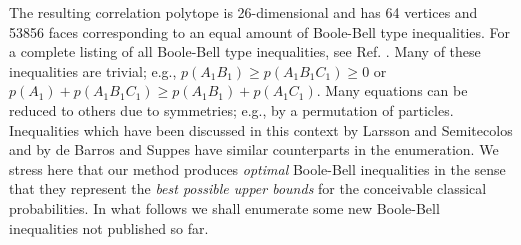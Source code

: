 The resulting correlation polytope is 26-dimensional and has 64 vertices and 53856 faces
corresponding to an equal amount of Boole-Bell type inequalities.
For a complete listing of all Boole-Bell type inequalities, see Ref. \cite{pit-svo-list1}.
Many of these inequalities are trivial; e.g.,   $p(A_1B_1) \ge  p(A_1B_1C_1)  \ge  0$ or
$ p(A_1) + p(A_1B_1C_1)\ge   p(A_1B_1) + p(A_1C_1) $.
Many equations can be reduced to others due to symmetries;
e.g., by a permutation of particles.
Inequalities which have been discussed in this context
by Larsson and Semitecolos \cite{lars-semi} and by
de Barros and Suppes \cite{deBarros-Suppes} have similar counterparts in the enumeration.
We stress here that our method produces {\em optimal} Boole-Bell inequalities in the sense that they
represent
the {\em best possible upper bounds} for the conceivable classical probabilities.
In what follows we shall enumerate some new Boole-Bell inequalities not published so far.
